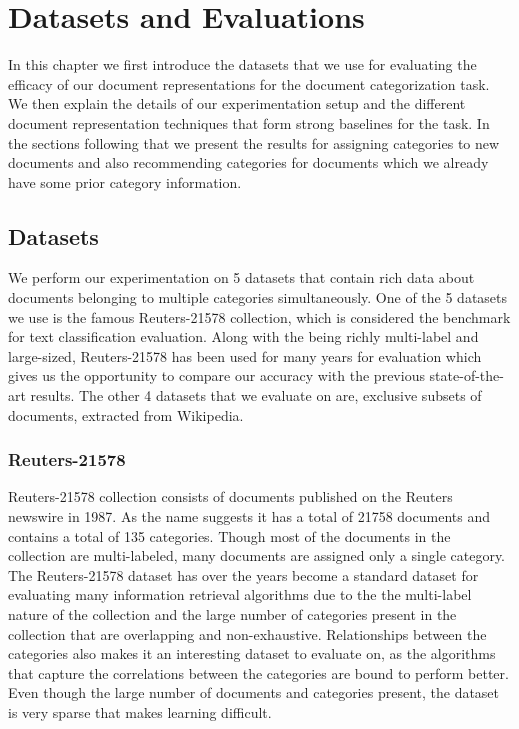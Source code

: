 \chapter{Datasets and Evaluations}
\label{chapter:evaluations}

In this chapter we first introduce the datasets that we use for evaluating the efficacy of our document representations for the document categorization task. We then explain the details of our experimentation setup and the different document representation techniques that form strong baselines for the task. In the sections following that we present the results for assigning categories to new documents and also recommending categories for documents which we already have some prior category information. 

\section{Datasets}
We perform our experimentation on 5 datasets that contain rich data about documents belonging to multiple categories simultaneously. One of the 5 datasets we use is the famous Reuters-21578 collection, which is considered the benchmark for text classification evaluation. Along with the being richly multi-label and large-sized, Reuters-21578 has been used for many years for evaluation which gives us the opportunity to compare our accuracy with the previous state-of-the-art results. The other 4 datasets that we evaluate on are, exclusive subsets of documents, extracted from Wikipedia.


\subsection{Reuters-21578}
Reuters-21578 collection consists of documents published on the Reuters newswire in 1987. As the name suggests it has a total of 21758 documents and contains a total of 135 categories. Though most of the documents in the collection are multi-labeled, many documents are assigned only a single category. The Reuters-21578 dataset has over the years become a standard dataset for evaluating many information retrieval algorithms due to the the multi-label nature of the collection and the large number of categories present in the collection that are overlapping and non-exhaustive. Relationships between the categories also makes it an interesting dataset to evaluate on, as the algorithms that capture the correlations between the categories are bound to perform better. Even though the large number of documents and categories present, the dataset is very sparse that makes learning difficult.

